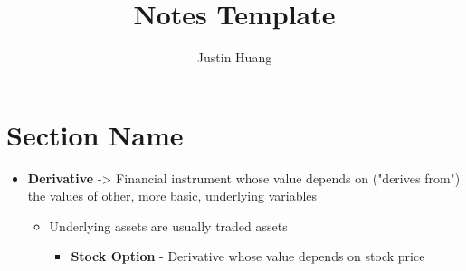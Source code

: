 \documentclass[11pt, letterpaper]{template}
\title{Notes Template}
\author{Justin Huang}
\begin{document}
\maketitle

\section{Section Name}

\begin{itemize}
	\item \textbf{Derivative} -\textgreater{} Financial instrument whose value depends on ("derives from") the values of other, more basic, underlying variables
	\begin{itemize}
		\item Underlying assets are usually traded assets
		\begin{itemize}
			\item \textbf{Stock Option} - Derivative whose value depends on stock price
		\end{itemize}
	\end{itemize}
\end{itemize}
\end{document}
